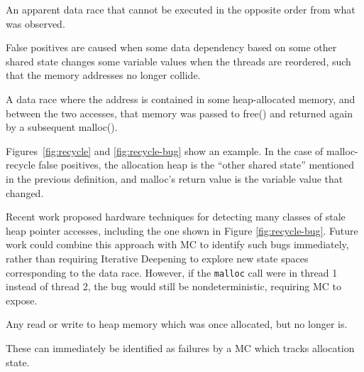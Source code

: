\begin{definition}
	An apparent data race that cannot be executed in the opposite order from what was observed.
\end{definition}

False positives are caused when some data dependency based on some other shared state %
changes some variable values when the threads are reordered, such that the memory addresses no longer collide.

\begin{definition}
	A data race where the address is contained in some heap-allocated memory, and between the two accesses, that memory was passed to free() and returned again by a subsequent malloc().
\end{definition}

Figures~\ref{fig:recycle} and \ref{fig:recycle-bug} show an example.
In the case of malloc-recycle false positives, the allocation heap is the ``other shared state'' mentioned in the previous definition, and malloc's return value is the variable value that changed.

Recent work \cite{sparc-ssm} proposed hardware techniques for detecting many classes of stale heap pointer accesses, including the one shown in Figure \ref{fig:recycle-bug}.
Future work could combine this approach with MC to identify such bugs immediately,
rather than requiring Iterative Deepening to explore new state spaces corresponding to the data race.
However, if the {\tt malloc} call were in thread 1 instead of thread 2, the bug would still be nondeterministic, requiring MC to expose.

\begin{definition}
	Any read or write to heap memory which was once allocated, but no longer is.
\end{definition}

These can immediately be identified as failures by a MC which tracks allocation state.

